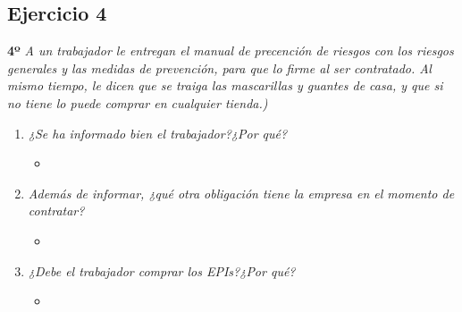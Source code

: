 \documentclass{article}
\begin{document}
      \subsection{Ejercicio 4}
        \textbf{4º} \textit{A un trabajador le entregan el manual de precención de riesgos con los riesgos generales y las medidas de prevención, para que lo firme al ser contratado. Al mismo tiempo, le dicen que se 
        traiga las mascarillas y guantes de casa, y que si no tiene lo puede comprar en cualquier tienda.)}
        \\
        \begin{enumerate}[label=(\alph*)]
          \item \textit{¿Se ha informado bien el trabajador?¿Por qué?}
            \begin{itemize}
              \item 
            \end{itemize}
          \item \textit{Además de informar, ¿qué otra obligación tiene la empresa en el momento de contratar?}
            \begin{itemize}
              \item 
            \end{itemize}
          \item \textit{¿Debe el trabajador comprar los EPIs?¿Por qué?}
            \begin{itemize}
              \item 
            \end{itemize}
        \end{enumerate}
    \newpage
\end{document}
